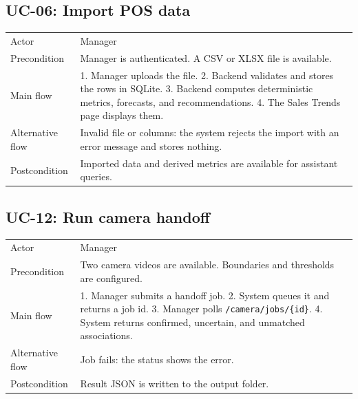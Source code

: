 \subsection*{UC-06: Import POS data}
\begin{tabular}{P{0.22\textwidth}P{0.68\textwidth}}
\toprule
Actor & Manager\\
Precondition & Manager is authenticated. A CSV or XLSX file is available.\\
Main flow & 1. Manager uploads the file. 2. Backend validates and stores the rows in SQLite. 3. Backend computes deterministic metrics, forecasts, and recommendations. 4. The Sales Trends page displays them.\\
Alternative flow & Invalid file or columns: the system rejects the import with an error message and stores nothing.\\
Postcondition & Imported data and derived metrics are available for assistant queries.\\
\bottomrule
\end{tabular}

\subsection*{UC-12: Run camera handoff}
\begin{tabular}{P{0.22\textwidth}P{0.68\textwidth}}
\toprule
Actor & Manager\\
Precondition & Two camera videos are available. Boundaries and thresholds are configured.\\
Main flow & 1. Manager submits a handoff job. 2. System queues it and returns a job id. 3. Manager polls \texttt{/camera/jobs/\{id\}}. 4. System returns confirmed, uncertain, and unmatched associations.\\
Alternative flow & Job fails: the status shows the error.\\
Postcondition & Result JSON is written to the output folder.\\
\bottomrule
\end{tabular}

